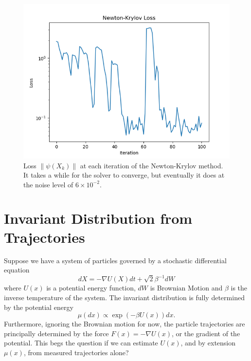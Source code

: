 \documentclass{article}
\newcommand{\norm}[1]{\left\lVert #1 \right\rVert}
\begin{document}
\begin{figure}
    \centering
    \includegraphics[width=0.75\linewidth]{figures/NK_2D_loss.png}
    \caption{Loss $\norm{\psi(X_k)}$ at each iteration of the Newton-Krylov method. It takes a while for the solver to converge, but eventually it does at the noise level of $6 \times 10^{-2}$.}
    \label{fig:nk_2d_loss}
\end{figure}

\section{Invariant Distribution from Trajectories}
Suppose we have a system of particles governed by a stochastic differential equation
\begin{equation}
    dX = -\nabla U(X)dt + \sqrt{2} \beta^{-1} dW
\end{equation}
where $U(x)$ is a potential energy function, $dW$ is Brownian Motion and $\beta$ is the inverse temperature of the system. The invariant distribution is fully determined by the potential energy 
\begin{equation}
    \mu(dx) \propto \exp\left(-\beta U(x)\right)dx.
\end{equation}
Furthermore, ignoring the Brownian motion for now, the particle trajectories are principally determined by the force $F(x) = -\nabla U(x)$, or the gradient of the potential. This begs the question if we can estimate $U(x)$, and by extension $\mu(x)$, from measured trajectories alone?
\end{document}
